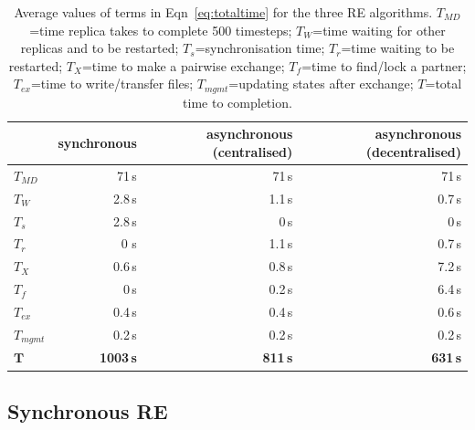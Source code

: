 \documentclass{rspublic}
\newcommand{\alnote}[1]{ {\textcolor{blue} { ***andre: #1 }}}
\newcommand{\athotanote}[1]{ {\textcolor{green} { ***athota: #1 }}}
\newcommand{\alnote}[1]{}
\newcommand{\athotanote}[1]{}
\begin{document}
\begin{table}
    \centering
	\begin{tabular}{|l|r|r|r|}
	\hline
	                        &\textbf{synchronous}  &\textbf{asynchronous (centralised)} 
	                        &\textbf{asynchronous (decentralised)}\\
	\hline
	\hline
	$T_{MD}$       &71\,s &71\,s &71\,s\\
	\hline
	\hline
	$T_{W}$        &2.8\,s &1.1\,s &0.7\,s\\
    \hline
    \hspace{2mm}$T_{s}$ &2.8\,s &0\,s &0\,s\\ 
    \hline
    \hspace{2mm}$T_{r}$ &0 s&1.1\,s &0.7\,s\\
	\hline\hline
	$T_{X}$        &0.6\,s &0.8\,s &7.2\,s\\
	\hline
	\hspace{2mm}$T_{f}$        &0\,s   &0.2\,s &6.4\,s\\
	\hline
	\hspace{2mm}$T_{ex}$       &0.4\,s &0.4\,s &0.6\,s\\
	\hline
    \hspace{2mm}$T_{mgmt}$    &0.2\,s &0.2\,s  &0.2\,s\\
	\hline
	\hline
	$\mathbf{T}$        &\textbf{1003\,s} &\textbf{811\,s}    &\textbf{631\,s}\\
	\hline
    \end{tabular}
    \caption{Average values of terms in Eqn~\ref{eq:totaltime} for the three RE algorithms. $T_{MD}$=time replica takes to complete 500 timesteps; $T_W$=time waiting for other replicas and to be restarted; $T_s$=synchronisation time; $T_r$=time waiting to be restarted; $T_X$=time to make a pairwise exchange; $T_f$=time to find/lock a partner; $T_{ex}$=time to write/transfer files; $T_{mgmt}$=updating states after exchange; $T$=total time to completion.}
	\label{table:repex_perf}
\end{table}

\subsection{Synchronous RE}
\label{sec:impl_sync_re}
\end{document}
